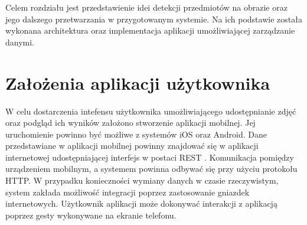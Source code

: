 Celem rozdziału jest przedstawienie idei detekcji przedmiotów na obrazie oraz jego dalszego przetwarzania w przygotowanym systemie. Na ich podstawie została wykonana architektura oraz implementacja aplikacji umożliwiającej zarządzanie danymi. 


\section{Założenia aplikacji użytkownika}{
W celu dostarczenia intefensu użytkownika umożliwiającego udostępnianie zdjęć oraz podgląd ich wyników założono stworzenie aplikacji mobilnej. Jej uruchomienie powinno być możliwe z systemów iOS oraz Android. Dane przedstawiane w aplikacji mobilnej powinny znajdować się w aplikacji internetowej udostępniającej interfejs w postaci REST \cite{REST}. Komunikacja pomiędzy urządzeniem mobilnym, a systemem powinna odbywać się przy użyciu protokołu HTTP. W przypadku konieczności wymiany danych w czasie rzeczywistym, system zakłada możliwość integracji poprzez zastosowanie gniazdek internetowych. Użytkownik aplikacji może dokonywać interakcji z aplikacją poprzez gesty wykonywane na ekranie telefonu. 
}

